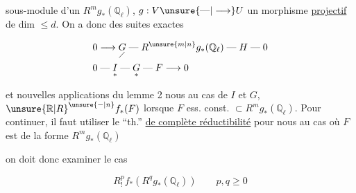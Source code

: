 
sous-module  d'un $R^m g_*(\mathbb Q_\ell)$, $g:V\unsure{\text{---}|\longrightarrow}U$ un morphisme \uline{projectif} de dim  $\leq d$. On a donc des suites exactes

\[
\begin{aligned}
0&\longrightarrow \underset{\diagup}{G}\mathrel{\text{---}} R^{\unsure{m|n}}g_*(\mathbb Q_\ell)\mathrel{\text{---}}H\mathrel{\text{---}}0\\
0&\mathrel{\text{---}}\underset{*}{I}\mathrel{\text{---}}\underset{*}{G}\mathrel{\text{---}}F\longrightarrow 0
\end{aligned}
\]

et   nouvelles applications du lemme 2 nous  au cas de $I$ et $G$, $\unsure{\mathbb R|R}^{\unsure{-|n}}f_*(F)$ lorsque  $F$ ess. const. $\subset R^{m}g_*(\mathbb Q_\ell)$. Pour continuer, il faut utiliser le ``th.'' \uline{de complète réductibilité} pour nous  au cas où $F$ est de la forme $R^m g_*(\mathbb Q_\ell)$

on doit donc examiner le cas

\[ R^p_! f_*(R^q g_*(\mathbb Q_\ell))\qquad p,q\geq0 \]


